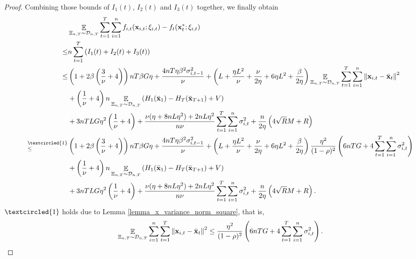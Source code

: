 \documentclass{article}
\begin{document}
\begin{proof}
Combining those bounds of $I_1(t)$, $I_2(t)$ and $I_3(t)$ together, we finally obtain
\begin{align}
\nonumber
& \EE_{ \Xi_{n,T} \sim \Dcal_{n,T} } \sum_{t=1}^T\sum_{i=1}^n f_{i,t}(\x_{i,t};\xi_{i,t}) - f_t(\x_t^\ast;\xi_{i,t}) \\ \nonumber
\le & n \sum_{t=1}^T \lrincir{ I_1(t) + I_2(t) + I_3(t) } \\ \nonumber
\le & \lrincir{1 + 2\beta\lrincir{\frac{3}{\nu}+4}}nT\beta G \eta + \frac{4nT\eta \beta^2 \sigma_{i,t-1}^2}{\nu} + \lrincir{ L + \frac{\eta L^2}{\nu} + \frac{\nu}{2\eta} + 6\eta L^2  + \frac{\beta}{2\eta} }\EE_{ \Xi_{n,T} \sim \Dcal_{n,T} }\sum_{t=1}^T\sum_{i=1}^n\lrnorm{\x_{i,t} - \bar{\x}_t }^2 \\ \nonumber 
&+ \lrincir{\frac{1}{\nu} + 4}n \EE_{ \Xi_{n,T} \sim \Dcal_{n,T} } \lrincir{H_1(\bar{\x}_1) - H_T(\bar{\x}_{T+1}) + V}  \\ \nonumber 
& + 3nTLG\eta^2\lrincir{ \frac{1}{\nu} + 4 } + \frac{\nu(\eta + 8nL\eta^2) + 2nL\eta^2}{n\nu} \sum_{t=1}^T\sum_{i=1}^n\sigma_{i,t}^2  + \frac{n}{2\eta}\lrincir{ 4\sqrt{R}M + R  } \\ \nonumber
\refabovecir{\le}{\textcircled{1}} & \lrincir{1 + 2\beta\lrincir{\frac{3}{\nu}+4}}nT\beta G \eta + \frac{4nT\eta \beta^2 \sigma_{i,t-1}^2}{\nu} + \lrincir{ L + \frac{\eta L^2}{\nu} + \frac{\nu}{2\eta} + 6\eta L^2  + \frac{\beta}{2\eta} }\frac{\eta^2}{(1-\rho)^2}   \lrincir{ 6nTG + 4\sum_{t=1}^T\sum_{i=1}^n \sigma_{i,t}^2 } \\ \nonumber 
&+ \lrincir{\frac{1}{\nu} + 4}n\EE_{ \Xi_{n,T} \sim \Dcal_{n,T} }\lrincir{H_1(\bar{\x}_1) - H_T(\bar{\x}_{T+1}) + V}  \\ \nonumber 
& + 3nTLG\eta^2\lrincir{ \frac{1}{\nu} + 4 } + \frac{\nu(\eta + 8nL\eta^2) + 2nL\eta^2}{n\nu} \sum_{t=1}^T\sum_{i=1}^n\sigma_{i,t}^2  + \frac{n}{2\eta}\lrincir{ 4\sqrt{R}M + R  }.
\end{align}  $\textcircled{1}$ holds due to Lemma \ref{lemma_x_variance_norm_square}, that is, 
\begin{align}
\nonumber
\mathop{\mathbb{E}}_{ \Xi_{n,T}\sim \mathcal{D}_{n,T} } \sum_{i=1}^n\sum_{t=1}^T \left\lVert{\bf x}_{i,t} - \bar{{\bf x}}_t\right\rVert^2 \le \frac{\eta^2}{(1-\rho)^2}   \left(  6nTG + 4\sum_{t=1}^T\sum_{i=1}^n \sigma_{i,t}^2  \right).
\end{align}



\end{proof}
\end{document}

